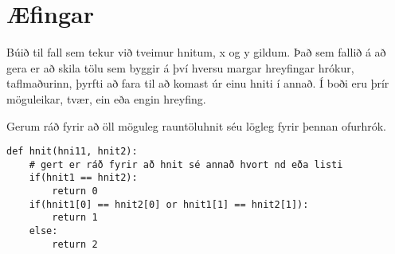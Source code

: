 



\newpage
\section{Æfingar}
\begin{exercise}\label{rei1}
Búið til fall sem tekur við tveimur hnitum, x og y gildum.
Það sem fallið á að gera er að skila tölu sem byggir á því hversu margar hreyfingar hrókur, taflmaðurinn, þyrfti að fara til að komast úr einu hniti í annað.
Í boði eru þrír möguleikar, tvær, ein eða engin hreyfing.

Gerum ráð fyrir að öll möguleg rauntöluhnit séu lögleg fyrir þennan ofurhrók.
\end{exercise}
\begin{Answer}[ref={rei1}]
	\begin{lstlisting}
def hnit(hni11, hnit2):
	# gert er ráð fyrir að hnit sé annað hvort nd eða listi
	if(hnit1 == hnit2):
		return 0
	if(hnit1[0] == hnit2[0] or hnit1[1] == hnit2[1]):
		return 1
	else:
		return 2\end{lstlisting}
\end{Answer}

